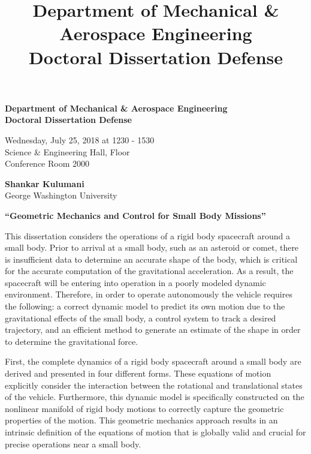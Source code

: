\documentclass[letterpaper]{article}
\title{Department of Mechanical \& Aerospace Engineering\\
Doctoral Dissertation Defense}
\date{}
\begin{document}
\begin{center}
    \textbf{\large
    Department of Mechanical \& Aerospace Engineering\\
    Doctoral Dissertation Defense
}
\end{center}

\begin{center}
    Wednesday, July 25, 2018 at 1230 - 1530\\
    Science \& Engineering Hall,  Floor\\
    Conference Room 2000
\end{center}

\begin{center}
    \textbf{Shankar Kulumani}\\
    George Washington University
\end{center}

\begin{center}
    \textbf{``Geometric Mechanics and Control for Small Body Missions''}
\end{center}

This dissertation considers the operations of a rigid body spacecraft around a small body.
Prior to arrival at a small body, such as an asteroid or comet, there is insufficient data to determine an accurate shape of the body, which is critical for the accurate computation of the gravitational acceleration. 
As a result, the spacecraft will be entering into operation in a poorly modeled dynamic environment.
Therefore, in order to operate autonomously the vehicle requires the following: a correct dynamic model to predict its own motion due to the gravitational effects of the small body, a control system to track a desired trajectory, and an efficient method to generate an estimate of the shape in order to determine the gravitational force.

First, the complete dynamics of a rigid body spacecraft around a small body are derived and presented in four different forms.
These equations of motion explicitly consider the interaction between the rotational and translational states of the vehicle.
Furthermore, this dynamic model is specifically constructed on the nonlinear manifold of rigid body motions to correctly capture the geometric properties of the motion. 
This geometric mechanics approach results in an intrinsic definition of the equations of motion that is globally valid and crucial for precise operations near a small body.
\end{document}
